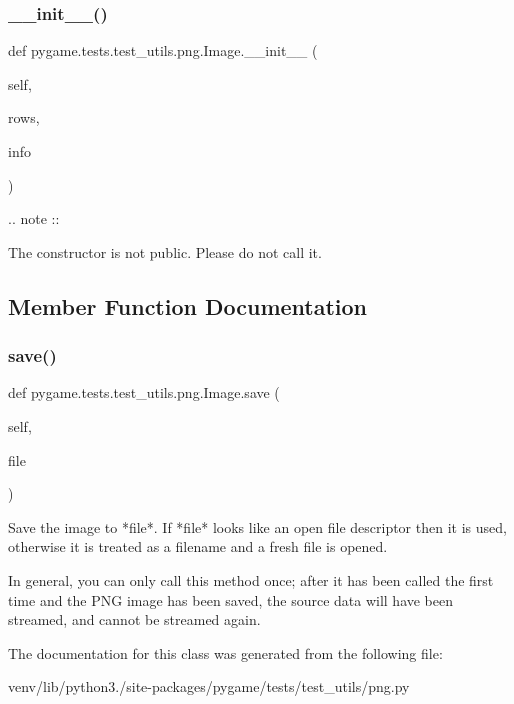\subsubsection{\texorpdfstring{\+\_\+\+\_\+init\+\_\+\+\_\+()}{\_\_init\_\_()}}
{\footnotesize\ttfamily def pygame.\+tests.\+test\+\_\+utils.\+png.\+Image.\+\_\+\+\_\+init\+\_\+\+\_\+ (\begin{DoxyParamCaption}\item[{}]{self,  }\item[{}]{rows,  }\item[{}]{info }\end{DoxyParamCaption})}

\begin{DoxyVerb}.. note ::

  The constructor is not public.  Please do not call it.
\end{DoxyVerb}
 

\subsection{Member Function Documentation}
\mbox{\label{classpygame_1_1tests_1_1test__utils_1_1png_1_1_image_a298487df13c064d01c79ded3b4c202e4}} 
\subsubsection{\texorpdfstring{save()}{save()}}
{\footnotesize\ttfamily def pygame.\+tests.\+test\+\_\+utils.\+png.\+Image.\+save (\begin{DoxyParamCaption}\item[{}]{self,  }\item[{}]{file }\end{DoxyParamCaption})}

\begin{DoxyVerb}Save the image to *file*.  If *file* looks like an open file
descriptor then it is used, otherwise it is treated as a
filename and a fresh file is opened.

In general, you can only call this method once; after it has
been called the first time and the PNG image has been saved, the
source data will have been streamed, and cannot be streamed
again.
\end{DoxyVerb}
 

The documentation for this class was generated from the following file\+:\begin{DoxyCompactItemize}
\item 
venv/lib/python3./site-\/packages/pygame/tests/test\+\_\+utils/png.\+py\end{DoxyCompactItemize}
